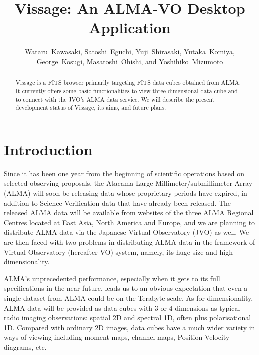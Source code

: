 
\resetcounters




\title{Vissage: An ALMA-VO Desktop Application}
\author{Wataru~Kawasaki, Satoshi~Eguchi, Yuji~Shirasaki, Yutaka~Komiya, George~Kosugi, Masatoshi~Ohishi, 
and Yoshihiko~Mizumoto
}


\begin{abstract}
Vissage is a FITS browser primarily targeting FITS data cubes obtained from ALMA. It currently offers some basic functionalities to view three-dimensional data cube and to connect with the JVO's ALMA data service. We will describe the present development status of Vissage, its aims, and future plans.
\end{abstract}

\section{Introduction}
Since it has been one year from the beginning of scientific operations based on selected observing proposals, the Atacama Large Millimeter/submillimeter Array (ALMA) will soon be releasing data whose proprietary periods have expired, in addition to Science Verification data that have already been released. The released ALMA data will be available from websites of the three ALMA  Regional Centres located at East Asia, North America and Europe, and we are planning to distribute ALMA data via the Japanese Virtual Observatory (JVO) as well. We are then faced with two problems in distributing ALMA data in the framework of Virtual Observatory (hereafter VO) system, namely, its huge size and high dimensionality. 

ALMA's unprecedented performance, especially when it gets to its full specifications in the near future, leads us to an obvious expectation that even a single dataset from ALMA could be on the Terabyte-scale. As for dimensionality, ALMA data will be provided as data cubes with 3 or 4 dimensions as typical radio imaging observations: spatial 2D and spectral  1D, often plus polarisational 1D. Compared with ordinary 2D images, data cubes have a much wider variety in ways of viewing including moment maps, channel maps, Position-Velocity diagrams, etc. 

